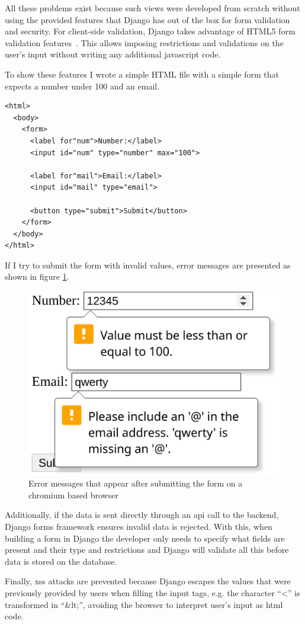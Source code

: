 All these problems exist because such views were developed from scratch without using the provided features that Django has out of the box for form validation and security.
For client-side validation, Django takes advantage of HTML5 form validation features~\cite{form-validation}.
This allows imposing restrictions and validations on the user's input without writing any additional javascript code.

To show these features I wrote a simple HTML file with a simple form that expects a number under 100 and an email.

\begin{verbatim}
<html>
  <body>
    <form>
      <label for"num">Number:</label>
      <input id="num" type="number" max="100">

      <label for"mail">Email:</label>
      <input id="mail" type="email">

      <button type="submit">Submit</button>
    </form>
  </body>
</html>
\end{verbatim}

If I try to submit the form with invalid values, error messages are presented as shown in figure \ref{fig:html-form-validation}.

\begin{figure}[h]
    \center
    \includegraphics[width=.3\textwidth]{html-form-validation}
    \caption{Error messages that appear after submitting the form on a chromium based browser}
    \label{fig:html-form-validation}
\end{figure}

Additionally, if the data is sent directly through an \gls{api} call to the backend, Django forms framework ensures invalid data is rejected.
With this, when building a form in Django the developer only needs to specify what fields are present and their type and restrictions and Django will validate all this before data is stored on the database.

Finally, \gls{xss} attacks are prevented because Django escapes the values that were previously provided by users when filling the input tags, e.g. the character ``<'' is transformed in ``\&lt;'', avoiding the browser to interpret user's input as \gls{html} code.

